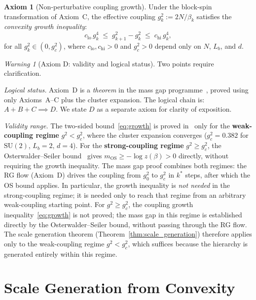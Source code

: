 \documentclass[12pt]{article}
\theoremstyle{definition}
\newtheorem{axiom}{Axiom}
\theoremstyle{remark}
\newtheorem{warning}[theorem]{Warning}
\newcommand{\SU}{\mathrm{SU}}
\newcommand{\gB}{g^2_c}
\begin{document}
\begin{axiom}[Non-perturbative coupling growth]
\label{ax:growth}
Under the block-spin transformation of Axiom~C, the effective
coupling $g^2_k := 2N/\beta_k$ satisfies the \emph{convexity growth
inequality}:
\begin{equation}\label{eq:growth}
\boxed{
c_{\mathrm{lo}}\,g^4_k \;\le\;
g^2_{k+1} - g^2_k \;\le\;
c_{\mathrm{hi}}\,g^4_k,
}
\end{equation}
for all $g^2_k \in (0, \gB)$, where $c_{\mathrm{lo}}, c_{\mathrm{hi}} > 0$
and $\gB > 0$ depend only on $N$, $L_b$, and $d$.
\end{axiom}

\begin{warning}[Axiom D: validity and logical status]
\label{warn:axiom_d_range}
Two points require clarification.

\emph{Logical status.}
Axiom~D is a \emph{theorem} in the mass gap
programme~\cite{Olbryk2026MG}, proved using only Axioms~A--C plus
the cluster expansion.  The logical chain is:
$A + B + C \implies D$.  We state $D$ as a separate axiom for
clarity of exposition.

\emph{Validity range.}
The two-sided bound~\eqref{eq:growth} is proved
in~\cite{Olbryk2026MG} only for the \textbf{weak-coupling regime}
$g^2 < \gB$, where the cluster expansion converges
($\gB = 0.382$ for $\SU(2)$, $L_b = 2$, $d = 4$).
For the \textbf{strong-coupling regime} $g^2 \ge \gB$, the
Osterwalder--Seiler bound~\cite{OS78} gives
$m_{\mathrm{OS}} \ge -\log z(\beta) > 0$ directly, without
requiring the growth inequality.  The mass gap proof combines both
regimes: the RG flow (Axiom~D) drives the coupling from $g^2_0$ to
$\gB$ in $k^*$ steps, after which the OS bound applies.  In
particular, the growth inequality is \emph{not needed} in the
strong-coupling regime; it is needed only to reach that regime from
an arbitrary weak-coupling starting point.
For $g^2 \ge \gB$, the coupling growth
inequality~\eqref{eq:growth} is not proved; the mass gap in this
regime is established directly by the Osterwalder--Seiler bound,
without passing through the RG flow.  The scale generation theorem
(Theorem~\ref{thm:scale_generation}) therefore applies only to
the weak-coupling regime $g^2 < \gB$, which suffices because
the hierarchy is generated entirely within this regime.
\end{warning}

\section{Scale Generation from Convexity}
\label{sec:scale}
\end{document}
